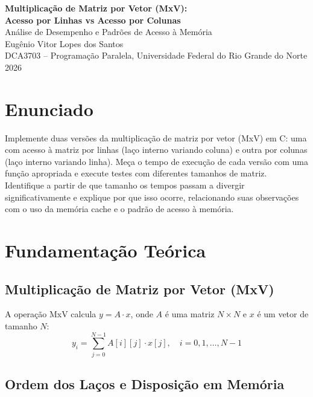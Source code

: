 \documentclass[11pt,letterpaper]{article}
\begin{document}
\pagestyle{plain}

\begin{center}
    {\LARGE\bfseries Multiplicação de Matriz por Vetor (MxV):}\\[0.3em]
    {\LARGE\bfseries Acesso por Linhas vs Acesso por Colunas}\\[0.5em]
    {\large Análise de Desempenho e Padrões de Acesso à Memória}\\[1em]
    {\normalsize Eugênio Vitor Lopes dos Santos}\\[0.3em]
    {\small DCA3703 -- Programação Paralela, Universidade Federal do Rio Grande do Norte}\\[0.3em]
    {\small 2026}
\end{center}

\vspace{1em}

\section{Enunciado}

Implemente duas versões da multiplicação de matriz por vetor (MxV) em C: uma com acesso à matriz por linhas (laço interno variando coluna) e outra por colunas (laço interno variando linha). Meça o tempo de execução de cada versão com uma função apropriada e execute testes com diferentes tamanhos de matriz. Identifique a partir de que tamanho os tempos passam a divergir significativamente e explique por que isso ocorre, relacionando suas observações com o uso da memória cache e o padrão de acesso à memória.

\section{Fundamentação Teórica}

\subsection{Multiplicação de Matriz por Vetor (MxV)}

A operação MxV calcula $y = A \cdot x$, onde $A$ é uma matriz $N \times N$ e $x$ é um vetor de tamanho $N$:
\[
y_i = \sum_{j=0}^{N-1} A[i][j] \cdot x[j], \quad i = 0, 1, \ldots, N-1
\]

\subsection{Ordem dos Laços e Disposição em Memória}
\end{document}
